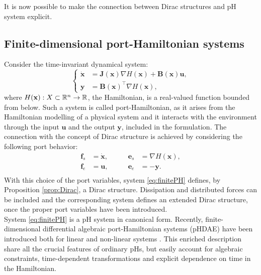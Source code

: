 It is now possible to make the connection between Dirac structures and pH system explicit.

\subsection{Finite-dimensional port-Hamiltonian systems}
 Consider the time-invariant dynamical system:
\begin{equation}
\label{eq:finitePH}
\begin{cases}
\dot{ \mathbf{x} } &= \mathbf{J}(\mathbf{x}) \nabla H(\mathbf{x}) + \mathbf{B}(\mathbf{x})\mathbf{u}, \\
\mathbf{y} &= \mathbf{B}(\mathbf{x})^\top \nabla H(\mathbf{x}),
\end{cases}
\end{equation}
where $ H(\mathbf{x}) : X \subset \mathbb{R}^n \rightarrow \mathbb{R} $, the Hamiltonian, is a real-valued function bounded from below. Such a system is called port-Hamiltonian, as it arises from the Hamiltonian modelling of a physical system and it interacts with the environment through the input $\mathbf{u}$ and the output $\mathbf{y}$, included in the formulation. The connection with the concept of Dirac structure is achieved by considering the following port behavior:
\begin{equation}
\begin{aligned}
\mathbf{f}_s &= \dot{\mathbf{x}}, \qquad 
&\mathbf{e}_s &= \nabla{H}(\mathbf{x}), \\
\mathbf{f}_e &=\mathbf{u}, \qquad
&\mathbf{e}_e &= -\mathbf{y}. \\
\end{aligned}
\end{equation}
With this choice of the port variables, system \eqref{eq:finitePH} defines, by Proposition \ref{prop:Dirac}, a Dirac structure. Dissipation and distributed forces can be included and the corresponding system defines an extended Dirac structure, once the proper port variables have been introduced. \\

System \ref{eq:finitePH} is a pH system in canonical form. Recently, finite-dimensional differential algebraic port-Hamiltonian systems (pHDAE) have been introduced both for linear \cite{beattie2018linear} and non-linear systems \cite{mehrmann2019structurepreserving}. This enriched description share all the crucial features of ordinary pHs, but easily account for algebraic constraints, time-dependent transformations and explicit dependence on time in the Hamiltonian. 


